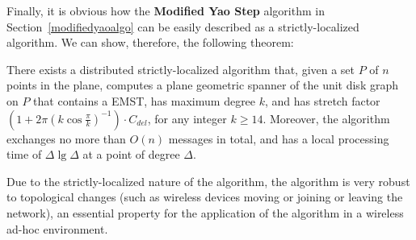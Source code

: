 \documentclass{stacs_proc}
\theoremstyle{plain}\newtheorem{satz}[thm]{Satz}
\begin{document}
Finally, it is obvious how the {\bf Modified Yao Step} algorithm in
Section~\ref{modifiedyaoalgo} can be easily described as a
strictly-localized algorithm. We can show, therefore, the following theorem:
\begin{theorem}
\label{spannerunit} There exists a distributed strictly-localized
algorithm that, given a set $P$ of $n$ points in the plane, computes a plane
geometric spanner of the unit disk graph on $P$ that contains a EMST, has
maximum degree $k$, and has stretch factor
$(1+2\pi(k\cos{{\frac{\pi}{k}}})^{-1})\cdot C_{del}$,
for any integer $k \geq 14$. Moreover, the algorithm exchanges no
more than $O(n)$ messages in total, and has a local processing time
of $\Delta\lg{\Delta}$ at a point of degree $\Delta$.
\end{theorem}
Due to the strictly-localized nature of the algorithm, the algorithm
is very robust to topological changes (such as wireless devices moving or
joining or leaving the network), an essential property for
the application of the algorithm in a wireless ad-hoc environment.

\end{document}
